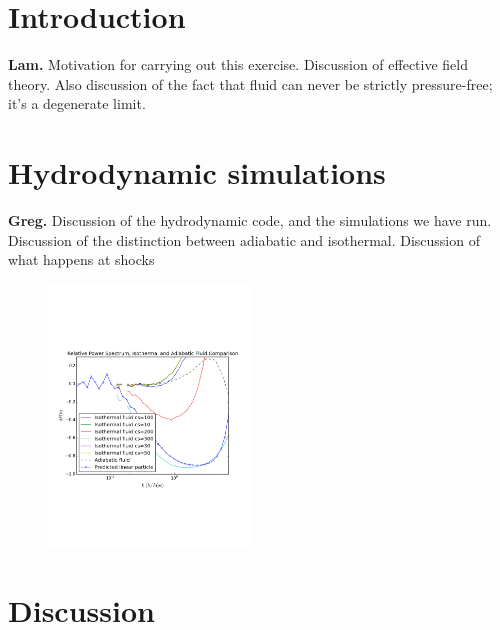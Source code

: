 \documentclass[aps,showpacs,twocolumn,floats,prd,superscriptaddress,nofootinbib]{revtex4}
\begin{document}

\maketitle

\section{Introduction}

{\bf Lam.} Motivation for carrying out this exercise.
Discussion of effective field theory. Also discussion
of the fact that fluid can never be strictly pressure-free;
it's a degenerate limit.

\section{Hydrodynamic simulations}

{\bf Greg.} Discussion of the hydrodynamic code, and the simulations
we have run. Discussion of the distinction between adiabatic and
isothermal. Discussion of what happens at shocks

\begin{figure}[htb]
\begin{center}
\includegraphics[width=0.48\textwidth]{z0fig}
\end{center}
\caption
{
}
\label{z0fig}
\end{figure}

\section{Discussion}
\end{document}
